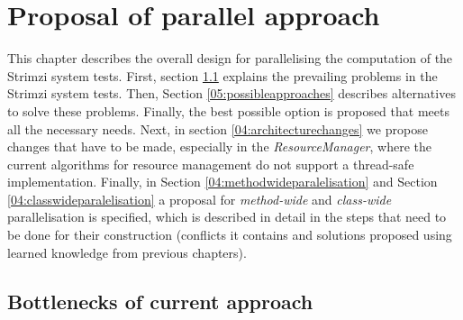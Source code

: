 \chapter{Proposal of parallel approach}

This chapter describes the overall design for parallelising the computation of the Strimzi system tests.
First, section \ref{05:bottlenecks} explains the prevailing problems in the Strimzi system tests.
Then, Section \ref{05:possibleapproaches} describes alternatives to solve these problems.
Finally, the best possible option is proposed that meets all the necessary needs.
Next, in section \ref{04:architecturechanges} we propose changes that have to be made, especially in the \emph{ResourceManager}, where the current algorithms for resource management do not support a thread-safe implementation.
Finally, in Section \ref{04:methodwideparalelisation} and Section \ref{04:classwideparalelisation} a proposal for \emph{method-wide} and \emph{class-wide} parallelisation is specified, which is described in detail in the steps that need to be done for their construction (conflicts it contains and solutions proposed using learned knowledge from previous chapters).

\section{Bottlenecks of current approach}
\label{05:bottlenecks}

